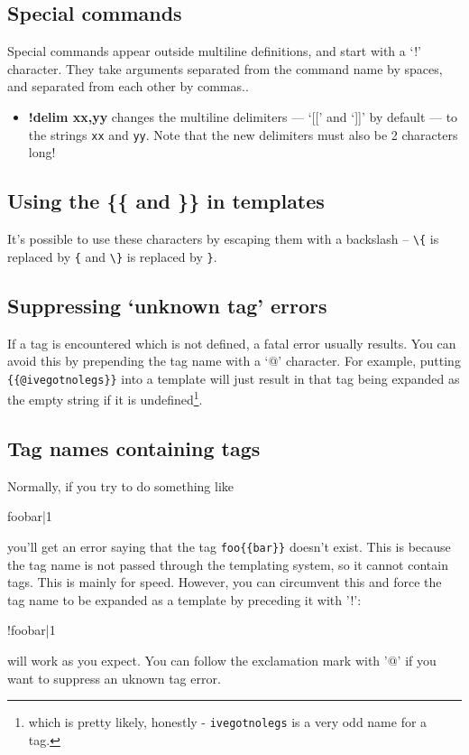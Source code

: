 \subsection{Special commands}
Special commands appear outside multiline definitions, and start with a `!' character. They take
arguments separated from the command name by spaces, and separated from each other by commas..
\begin{itemize}
\item \textbf{!delim xx,yy} changes the multiline delimiters --- `[[' and `]]' by default --- to the strings
\texttt{xx} and \texttt{yy}. Note that the new delimiters must also be 2 characters long!
\end{itemize}

\subsection{Using the \{\{ and \}\} in templates}
It's possible to use these characters by escaping them with a backslash --
\verb,\{, is replaced by \verb,{, and \verb,\}, is replaced by \verb,},.

\subsection{Suppressing `unknown tag' errors}
If a tag is encountered which is not defined, a fatal error usually results. You can avoid this by
prepending the tag name with a `@' character. For example, putting \verb,{{@ivegotnolegs}}, into a template
will just result in that tag being expanded as the empty string if it is undefined\footnote{which is pretty
likely, honestly - \texttt{ivegotnolegs} is a very odd name for a tag.}.

\subsection{Tag names containing tags}
Normally, if you try to do something like 
\begin{MyVerbatim}
{{foo{{bar}}|1}}
\end{MyVerbatim}
you'll get an error saying that the tag \verb,foo{{bar}}, doesn't exist. This is because the tag name is
not passed through the templating system, so it cannot contain tags. This is mainly for speed. However,
you can circumvent this and force the tag name to be expanded as a template by preceding it with '!':
\begin{MyVerbatim}
{{!foo{{bar}}|1}}
\end{MyVerbatim}
will work as you expect. You can follow the exclamation mark with '@' if you want to suppress an
uknown tag error.

